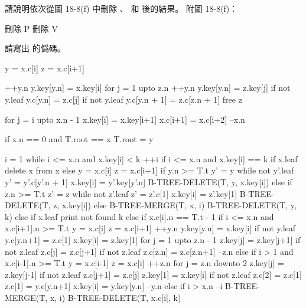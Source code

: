\startsection[
  title={Deleting a key from a B-tree},
]

\startEXERCISE
請說明依次從圖 18-8(f) 中刪除 、  和  後的結果。
附圖 18-8(f)：

\externalfigure[output/e18_3_1-1]
\stopEXERCISE

\startANSWER
{}
{\externalfigure[output/e18_3_1-3][scale=800]}{刪除 P}
{\externalfigure[output/e18_3_1-4][scale=800]}{刪除 V}
\stopcombination
\stopANSWER

\startEXERCISE
請寫出  的僞碼。
\stopEXERCISE

\startANSWER
{}
\startCLRS
y = x.c[i]
z = x.c[i+1]

++y.n
y.key[y.n] = x.key[i]
for j = 1 upto z.n
	++y.n
	y.key[y.n] = z.key[j]
	if not y.leaf
		y.c[y.n] = z.c[j]
if not y.leaf
	y.c[y.n + 1] = z.c[z.n + 1]
free z

for j = i upto x.n - 1
	x.key[i] = x.key[i+1]
	x.c[i+1] = x.c[i+2]
--x.n

if x.n == 0 and T.root == x
	T.root = y
\stopCLRS

\startCLRS
i = 1
while i <= x.n and x.key[i] < k
	++i
if i <= x.n and x.key[i] == k
	if x.leaf
		delete x from x
	else
		y = x.c[i]
		z = x.c[i+1]
		if y.n >= T.t
			y' = y
			while not y'.leaf
				y' = y'.c[y'.n + 1]
			x.key[i] = y'.key[y'.n]
			B-TREE-DELETE(T, y, x.key[i])
		else if z.n >= T.t
			z' = z
			while not z'.leaf
				z' = z'.c[1]
			x.key[i] = z'.key[1]
			B-TREE-DELETE(T, z, x.key[i])
		else
			B-TREE-MERGE(T, x, i)
			B-TREE-DELETE(T, y, k)
else
	if x.leaf
		print not found k
	else
		if x.c[i].n == T.t - 1
			if i <= x.n and x.c[i+1].n >= T.t
				y = x.c[i]
				z = x.c[i+1]
				++y.n
				y.key[y.n] = x.key[i]
				if not y.leaf
					y.c[y.n+1] = z.c[1]
				x.key[i] = z.key[1]
				for j = 1 upto z.n - 1
					z.key[j] = z.key[j+1]
					if not z.leaf
						z.c[j] = z.c[j+1]
				if not z.leaf
					z.c[z.n] = z.c[z.n+1]
				--z.n
			else if i > 1 and x.c[i-1].n >= T.t
				y = x.c[i-1]
				z = x.c[i]
				++z.n
				for j = z.n downto 2
					z.key[j] = z.key[j-1]
					if not z.leaf
						z.c[j+1] = z.c[j]
				z.key[1] = x.key[i]
				if not z.leaf
					z.c[2] = z.c[1]
					z.c[1] = y.c[y.n+1]
				x.key[i] = y.key[y.n]
				--y.n
			else
				if i > x.n
					--i
				B-TREE-MERGE(T, x, i)
		B-TREE-DELETE(T, x.c[i], k)
\stopCLRS
\stopANSWER

\stopsection

